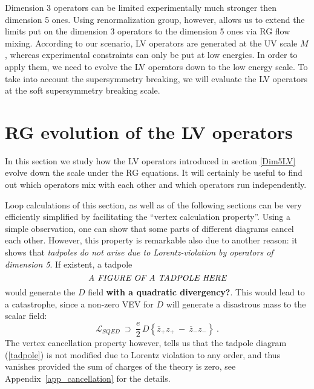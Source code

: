 \documentclass[a4paper,12pt]{article}
\begin{document}
	Dimension 3 operators can be limited experimentally
	much stronger then dimension 5 ones.
	Using renormalization group, however, allows us to
	extend the limits put on the dimension 3 operators
	to the dimension 5 ones via RG flow mixing. 
	According to our scenario, LV operators are generated
	at the UV scale $ M $, whereas experimental constraints
	can only be put at low energies.
	In order to apply them, we need to evolve the LV operators
	down to the low energy scale.
	To take into account the supersymmetry breaking, we will
	evaluate the LV operators at the soft supersymmetry
	breaking scale.

\section{RG evolution of the LV operators}
\label{RGEvolution}
	In this section we study how the LV operators introduced
	in section \ref{Dim5LV} evolve down the scale under
	the RG equations.
	It will certainly be useful to find out which operators mix
	with each other and which operators run independently.

	Loop calculations of this section, as well as of the
	following sections can be very efficiently simplified 
	by facilitating the ``vertex calculation property''.
	Using a simple observation, one can show that some
	parts of different diagrams cancel each other. 
	However, this property is remarkable also due to another
	reason: it shows that {\it tadpoles do not arise due
	to Lorentz-violation by operators of dimension 5}. 
	If existent, a tadpole 
\begin{equation}
\label{tadpole}
	\emph{A FIGURE OF A TADPOLE HERE}
\end{equation}
	would generate the $ D $ field {\bf with a quadratic divergency?}.
	This would lead to a catastrophe, since a non-zero VEV for $ D $ 
	will generate a disastrous mass to the scalar field:
\begin{equation}
\nonumber
	\mathcal{L}_{SQED} ~\supset~ 
	\frac{e}
	     {2}\,
	D
	\left\{
		\overline{z}_+ z_+
		~-~
		\overline{z}_- z_-
	\right\}~.
\end{equation}
	The vertex cancellation property however, tells us that
	the tadpole diagram (\ref{tadpole}) is not modified due to
	Lorentz violation to any order, and thus vanishes provided the
	sum of charges of the theory is zero, 
	see Appendix~\ref{app_cancellation} for the details.
\end{document}
